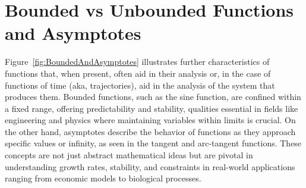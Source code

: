 \section{Bounded vs Unbounded Functions and Asymptotes}
\label{sec:BoundedFunctions}

Figure~\ref{fig:BoundedAndAsymptotes} illustrates further characteristics of functions that, when present, often aid in their analysis or, in the case of functions of time (aka, trajectories), aid in the analysis of the system that produces them. Bounded functions, such as the sine function, are confined within a fixed range, offering predictability and stability, qualities essential in fields like engineering and physics where maintaining variables within limits is crucial. On the other hand, asymptotes describe the behavior of functions as they approach specific values or infinity, as seen in the tangent and arc-tangent functions. These concepts are not just abstract mathematical ideas but are pivotal in understanding growth rates, stability, and constraints in real-world applications ranging from economic models to biological processes. 

\bigskip

